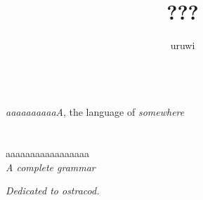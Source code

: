 \documentclass{book}
\title{???}
\author{uruwi}
\newcommand{\lname}{aaaaaaaaaaA}
\begin{document}
\pagecolor{YellowOrange!25}

\begin{titlepage}
    \makeatletter
    \begin{center}
        {\Huge \sffamily \textcolor{Firebrick2}{\@title}\\}
        {\large \textit{\lname}, the language of \textit{somewhere} \\}
        {\color{OrangeRed} \hprule \vspace{1.5ex} \\}
        \vspace{1.5cm}
        {\Large\bfseries \@author}\\[5pt]
        \vspace{2cm}
        {aaaaaaaaaaaaaaaaa} \\[5pt]
        \emph{A complete grammar}\\[2cm]
        \vfill
        \vfill
        {\@date}
    \end{center}
    \makeatother
\end{titlepage}

\pagecolor{YellowOrange!15}

\begin{center}
    \textit{Dedicated to ostracod.}
\end{center}
\end{document}
